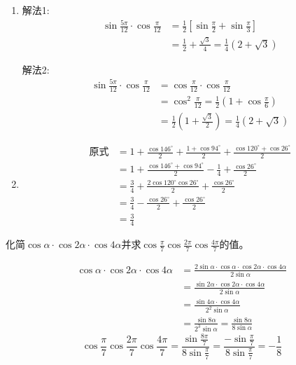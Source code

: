 \begin{solution}
\begin{enumerate}
    \item 解法1: 
\[\begin{split}
    \sin\frac{5\pi}{12}\cdot\cos\frac{\pi}{12}&=\frac{1}{2}\left[\sin\frac{\pi}{2}+\sin\frac{\pi}{3}\right]\\
    &=\frac{1}{2}+\frac{\sqrt{3}}{4}=\frac{1}{4}(2+\sqrt{3})
\end{split}\]    

解法2: 
\[\begin{split}
    \sin\frac{5\pi}{12}\cdot\cos\frac{\pi}{12}&=\cos\frac{\pi}{12}\cdot \cos\frac{\pi}{12}\\
    &=\cos^2\frac{\pi}{12}=\frac{1}{2}\left(1+\cos\frac{\pi}{6}\right)\\
    &=\frac{1}{2}\left(1+\frac{\sqrt{3}}{2}\right)=\frac{1}{4}\left(2+\sqrt{3}\right)
\end{split}\]    

\item \[\begin{split}
    \text{原式}&=1+\frac{\cos146^{\circ}}{2}+\frac{1+\cos94^{\circ}}{2}+\frac{\cos120^{\circ}+\cos26^{\circ}}{2}\\
    &=1+\frac{\cos146^{\circ}+\cos94^{\circ}}{2}-\frac{1}{4}+\frac{\cos26^{\circ}}{2}\\
    &=\frac{3}{4}+\frac{2\cos120^{\circ}\cos26^{\circ}}{2}+\frac{\cos26^{\circ}}{2}\\
    &=\frac{3}{4}-\frac{\cos26^{\circ}}{2}+\frac{\cos26^{\circ}}{2}\\
    &=\frac{3}{4}
\end{split}\]
\end{enumerate}
\end{solution}


\begin{example}
化简$\cos\alpha\cdot \cos2\alpha\cdot \cos4\alpha$并求$\cos\frac{\pi}{7}\cos\frac{2\pi}{7}\cos\frac{4\pi}{7}$的值。
\end{example}

\begin{solution}
\[\begin{split}
    \cos\alpha\cdot \cos2\alpha\cdot \cos4\alpha&=\frac{2\sin\alpha\cdot \cos\alpha\cdot \cos2\alpha\cdot \cos4\alpha}{2\sin\alpha}\\
    &=\frac{\sin2\alpha\cdot \cos2\alpha\cdot \cos4\alpha}{2\sin\alpha}\\
    &=\frac{\sin4\alpha\cdot \cos4\alpha}{2^2\sin\alpha}\\
    &=\frac{\sin8\alpha}{2^3\sin\alpha}=\frac{\sin 8\alpha}{8\sin \alpha}
\end{split}
\]
\[\cos\frac{\pi}{7}\cos\frac{2\pi}{7}\cos\frac{4\pi}{7}=\frac{\sin \frac{8\pi}{7}}{8\sin \frac{\pi}{7}}=\frac{-\sin\frac{\pi}{7}}{8\sin\frac{\pi}{7}}=-\frac{1}{8}\]
    
\end{solution}

